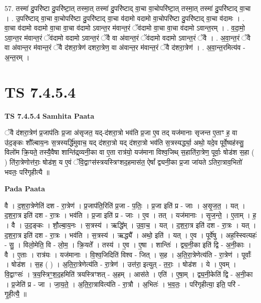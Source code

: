 \documentclass[17pt]{extarticle}
\begin{document}
57. तस्मा॑ दु॒परि॑ष्टा दु॒परि॑ष्टा॒त् तस्मा॒त् तस्मा॑ दु॒परि॑ष्टाद् वा॒चा वा॒चोपरि॑ष्टा॒त् तस्मा॒त् तस्मा॑ दु॒परि॑ष्टाद् वा॒चा । . उ॒परि॑ष्टाद् वा॒चा वा॒चोपरि॑ष्टा दु॒परि॑ष्टाद् वा॒चा व॑दामो वदामो वा॒चोपरि॑ष्टा दु॒परि॑ष्टाद् वा॒चा व॑दामः । . वा॒चा व॑दामो वदामो वा॒चा वा॒चा व॑दामो ऽवान्त॒र म॑वान्त॒रं ॅव॑दामो वा॒चा वा॒चा व॑दामो ऽवान्त॒रम् । . व॒दा॒मो॒ ऽवा॒न्त॒र म॑वान्त॒रं ॅव॑दामो वदामो ऽवान्त॒रं ॅवै वा अ॑वान्त॒रं ॅव॑दामो वदामो ऽवान्त॒रं ॅवै । . अ॒वा॒न्त॒रं ॅवै वा अ॑वान्त॒र म॑वान्त॒रं ॅवै द॑शरा॒त्रेण॑ दशरा॒त्रेण॒ वा अ॑वान्त॒र म॑वान्त॒रं ॅवै द॑शरा॒त्रेण॑ । . अ॒वा॒न्त॒रमित्य॑व - अ॒न्त॒रम् । \newline
\pagebreak
{}

\section{ TS 7.4.5.4 }

\textbf{TS 7.4.5.4 } \newline
\textbf{Samhita Paata} \newline

ॅवै द॑शरा॒त्रेण॑ प्र॒जाप॑तिः प्र॒जा अ॑सृजत॒ यद्-द॑शरा॒त्रो भव॑ति प्र॒जा ए॒व तद् यज॑मानाः सृजन्त ए॒ताꣳ ह॒ वा उ॑द॒ङ्कः शौ᳚ल्बाय॒नः स॒त्रस्यर्द्धि॑मुवाच॒ यद् द॑शरा॒त्रो यद् द॑शरा॒त्रो भव॑ति स॒त्रस्यर्द्ध्या॒ अथो॒ यदे॒व पूर्वे॒ष्वह॑स्सु॒ विलो॑म क्रि॒यते॒ तस्यै॒वैषा शान्ति॑द्र्व्यनी॒का वा ए॒ता रात्र॑यो॒ यज॑माना विश्व॒जिथ् स॒हाति॑रा॒त्रेण॒ पूर्वाः॒ षोड॑श स॒हा ( ) ति॑रा॒त्रेणोत्त॑राः॒ षोड॑श॒ य ए॒वं ॅवि॒द्वाꣳस॑स्त्रयस्त्रिꣳशद॒हमास॑त॒ ऐषां᳚ द्व्यनी॒का प्र॒जा जा॑यते ऽतिरा॒त्राव॒भितो॑ भवतः॒ परि॑गृहीत्यै ॥ \newline

\textbf{Pada Paata} \newline

वै । द॒श॒रा॒त्रेणेति॑ दश - रा॒त्रेण॑ । प्र॒जाप॑ति॒रिति॑ प्र॒जा - प॒तिः॒ । प्र॒जा इति॑ प्र - जाः । अ॒सृ॒ज॒त॒ । यत् । द॒श॒रा॒त्र इति॑ दश - रा॒त्रः । भव॑ति । प्र॒जा इति॑ प्र - जाः । ए॒व । तत् । यज॑मानाः । सृ॒ज॒न्ते॒ । ए॒ताम् । ह॒ । वै । उ॒द॒ङ्कः । शौ॒ल्बा॒य॒नः । स॒त्रस्य॑ । ऋद्धि᳚म् । उ॒वा॒च॒ । यत् । द॒श॒रा॒त्र इति॑ दश - रा॒त्रः । यत् । द॒श॒रा॒त्र इति॑ दश - रा॒त्रः । भव॑ति । स॒त्रस्य॑ । ऋद्ध्यै᳚ । अथो॒ इति॑ । यत् । ए॒व । पूर्वे॑षु । अह॒स्स्वित्यहः॑ - सु॒ । विलो॒मेति॒ वि - लो॒म॒ । क्रि॒यते᳚ । तस्य॑ । ए॒व । ए॒षा । शान्तिः॑ । द्व्य॒नी॒का इति॑ द्वि - अ॒नी॒काः । वै । ए॒ताः । रात्र॑यः । यज॑मानाः । वि॒श्व॒जिदिति॑ विश्व - जित् । स॒ह । अ॒ति॒रा॒त्रेणेत्य॑ति - रा॒त्रेण॑ । पूर्वाः᳚ । षोड॑श । स॒ह ( ) । अ॒ति॒रा॒त्रेणेत्य॑ति - रा॒त्रेण॑ । उत्त॑रा॒ इत्युत् - त॒राः॒ । षोड॑श । ये । ए॒वम् । वि॒द्वाꣳसः॑ । त्र॒य॒स्त्रिꣳ॒॒श॒द॒हमिति॑ त्रयस्त्रिꣳशत् - अ॒हम् । आस॑ते । एति॑ । ए॒षा॒म् । द्व्य॒नी॒केति॑ द्वि - अ॒नी॒का । प्र॒जेति॑ प्र - जा । जा॒य॒ते॒ । अ॒ति॒रा॒त्रावित्य॑ति - रा॒त्रौ । अ॒भितः॑ । भ॒व॒तः॒ । परि॑गृहीत्या॒ इति॒ परि॑ - गृ॒ही॒त्यै॒ ॥  \newline
\end{document}
